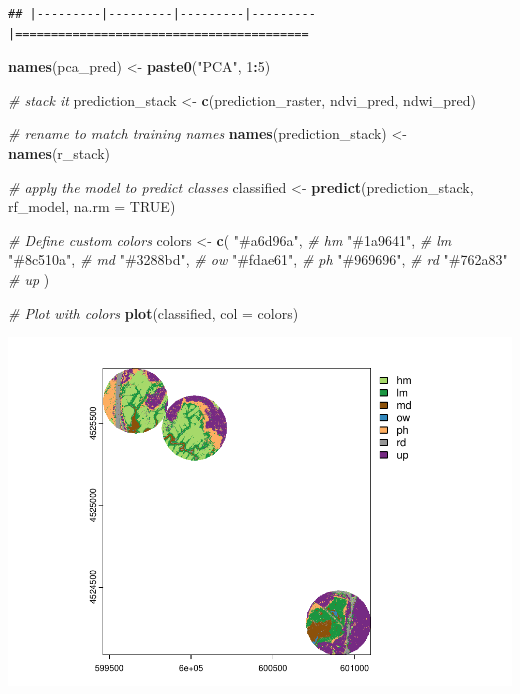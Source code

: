 \documentclass[
]{article}
\newenvironment{Shaded}{\begin{snugshade}}{\end{snugshade}}
\newcommand{\AttributeTok}[1]{\textcolor[rgb]{0.13,0.29,0.53}{#1}}
\newcommand{\CommentTok}[1]{\textcolor[rgb]{0.56,0.35,0.01}{\textit{#1}}}
\newcommand{\ConstantTok}[1]{\textcolor[rgb]{0.56,0.35,0.01}{#1}}
\newcommand{\DecValTok}[1]{\textcolor[rgb]{0.00,0.00,0.81}{#1}}
\newcommand{\FunctionTok}[1]{\textcolor[rgb]{0.13,0.29,0.53}{\textbf{#1}}}
\newcommand{\NormalTok}[1]{#1}
\newcommand{\OtherTok}[1]{\textcolor[rgb]{0.56,0.35,0.01}{#1}}
\newcommand{\SpecialCharTok}[1]{\textcolor[rgb]{0.81,0.36,0.00}{\textbf{#1}}}
\newcommand{\StringTok}[1]{\textcolor[rgb]{0.31,0.60,0.02}{#1}}
\begin{document}
\begin{verbatim}
## |---------|---------|---------|---------|=========================================                                          
\end{verbatim}

\begin{Shaded}
\begin{Highlighting}[]
\FunctionTok{names}\NormalTok{(pca\_pred) }\OtherTok{\textless{}{-}} \FunctionTok{paste0}\NormalTok{(}\StringTok{"PCA"}\NormalTok{, }\DecValTok{1}\SpecialCharTok{:}\DecValTok{5}\NormalTok{)}

\CommentTok{\# stack it}
\NormalTok{prediction\_stack }\OtherTok{\textless{}{-}} \FunctionTok{c}\NormalTok{(prediction\_raster, ndvi\_pred, ndwi\_pred)}

\CommentTok{\# rename to match training names}
\FunctionTok{names}\NormalTok{(prediction\_stack) }\OtherTok{\textless{}{-}} \FunctionTok{names}\NormalTok{(r\_stack)}

\CommentTok{\# apply the model to predict classes}
\NormalTok{classified }\OtherTok{\textless{}{-}} \FunctionTok{predict}\NormalTok{(prediction\_stack, rf\_model, }\AttributeTok{na.rm =} \ConstantTok{TRUE}\NormalTok{)}

\CommentTok{\# Define custom colors}
\NormalTok{colors }\OtherTok{\textless{}{-}} \FunctionTok{c}\NormalTok{(}
  \StringTok{"\#a6d96a"}\NormalTok{,  }\CommentTok{\# hm  }
  \StringTok{"\#1a9641"}\NormalTok{,  }\CommentTok{\# lm  }
  \StringTok{"\#8c510a"}\NormalTok{,  }\CommentTok{\# md  }
  \StringTok{"\#3288bd"}\NormalTok{,  }\CommentTok{\# ow  }
  \StringTok{"\#fdae61"}\NormalTok{,  }\CommentTok{\# ph  }
  \StringTok{"\#969696"}\NormalTok{,  }\CommentTok{\# rd  }
  \StringTok{"\#762a83"}   \CommentTok{\# up  }
\NormalTok{)}



\CommentTok{\# Plot with colors}
\FunctionTok{plot}\NormalTok{(classified, }\AttributeTok{col =}\NormalTok{ colors)}
\end{Highlighting}
\end{Shaded}

\includegraphics{veg_model_files/figure-latex/unnamed-chunk-8-1.pdf}
\end{document}
